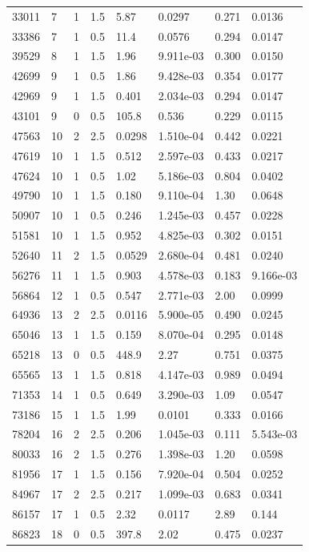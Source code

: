\documentclass[preview]{standalone}
\begin{document}
{{\begin{tabular}{L{1.2cm}C{1.2cm} C{0.3cm}C{0.5cm} C{1.4cm}C{1.4cm} C{1.4cm}C{1.4cm}}
  33011  &     7  & 1     & 1.5 &  5.87  & 0.0297  & 0.271 &  0.0136   \\ 
  33386  &     7  & 1     & 0.5 &  11.4  & 0.0576  & 0.294 &  0.0147   \\ 
  39529  &     8  & 1     & 1.5 &  1.96  & 9.911e-03  & 0.300 &  0.0150   \\ 
  42699  &     9  & 1     & 0.5 &  1.86  & 9.428e-03  & 0.354 &  0.0177   \\ 
  42969  &     9  & 1     & 1.5 &  0.401  & 2.034e-03  & 0.294 &  0.0147   \\ 
  43101  &     9  & 0     & 0.5 &  105.8  & 0.536  & 0.229 &  0.0115   \\ 
  47563  &    10  & 2     & 2.5 &  0.0298  & 1.510e-04  & 0.442 &  0.0221   \\ 
  47619  &    10  & 1     & 1.5 &  0.512  & 2.597e-03  & 0.433 &  0.0217   \\ 
  47624  &    10  & 1     & 0.5 &  1.02  & 5.186e-03  & 0.804 &  0.0402   \\ 
  49790  &    10  & 1     & 1.5 &  0.180  & 9.110e-04  & 1.30 &  0.0648   \\ 
  50907  &    10  & 1     & 0.5 &  0.246  & 1.245e-03  & 0.457 &  0.0228   \\ 
  51581  &    10  & 1     & 1.5 &  0.952  & 4.825e-03  & 0.302 &  0.0151   \\ 
  52640  &    11  & 2     & 1.5 &  0.0529  & 2.680e-04  & 0.481 &  0.0240   \\ 
  56276  &    11  & 1     & 1.5 &  0.903  & 4.578e-03  & 0.183 &  9.166e-03   \\ 
  56864  &    12  & 1     & 0.5 &  0.547  & 2.771e-03  & 2.00 &  0.0999   \\ 
  64936  &    13  & 2     & 2.5 &  0.0116  & 5.900e-05  & 0.490 &  0.0245   \\ 
  65046  &    13  & 1     & 1.5 &  0.159  & 8.070e-04  & 0.295 &  0.0148   \\ 
  65218  &    13  & 0     & 0.5 &  448.9  & 2.27  & 0.751 &  0.0375   \\ 
  65565  &    13  & 1     & 1.5 &  0.818  & 4.147e-03  & 0.989 &  0.0494   \\ 
  71353  &    14  & 1     & 0.5 &  0.649  & 3.290e-03  & 1.09 &  0.0547   \\ 
  73186  &    15  & 1     & 1.5 &  1.99  & 0.0101  & 0.333 &  0.0166   \\ 
  78204  &    16  & 2     & 2.5 &  0.206  & 1.045e-03  & 0.111 &  5.543e-03   \\ 
  80033  &    16  & 2     & 1.5 &  0.276  & 1.398e-03  & 1.20 &  0.0598   \\ 
  81956  &    17  & 1     & 1.5 &  0.156  & 7.920e-04  & 0.504 &  0.0252   \\ 
  84967  &    17  & 2     & 2.5 &  0.217  & 1.099e-03  & 0.683 &  0.0341   \\ 
  86157  &    17  & 1     & 0.5 &  2.32  & 0.0117  & 2.89 &  0.144   \\ 
  86823  &    18  & 0     & 0.5 &  397.8  & 2.02  & 0.475 &  0.0237   \\ 
\hline 
\end{tabular} 

}}
\end{document}
